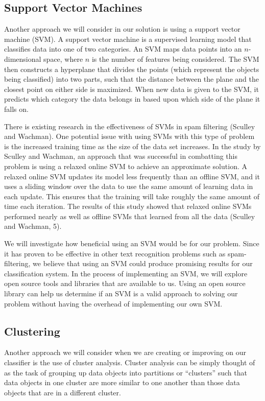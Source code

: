 \documentclass[cs,proposal]{hmcclinic}
\begin{document}
\subsection{Support Vector Machines}

Another approach we will consider in our solution is using a support vector machine (SVM). A support vector machine is a supervised learning model that classifies data into one of two categories. An SVM maps data points into an $n$-dimensional space, where $n$ is the number of features being considered. The SVM then constructs a hyperplane that divides the points (which represent the objects being classified) into two parts, such that the distance between the plane and the closest point on either side is maximized. When new data is given to the SVM, it predicts which category the data belongs in based upon which side of the plane it falls on.

There is existing research in the effectiveness of SVMs in spam filtering (Sculley and Wachman). One potential issue with using SVMs with this type of problem is the increased training time as the size of the data set increases. In the study by Sculley and Wachman, an approach that was successful in combatting this problem is using a relaxed online SVM to achieve an approximate solution. A relaxed online SVM updates its model less frequently than an offline SVM, and it uses a sliding window over the data to use the same amount of learning data in each update. This ensures that the training will take roughly the same amount of time each iteration. The results of this study showed that relaxed online SVMs performed nearly as well as offline SVMs that learned from all the data (Sculley and Wachman, 5).

We will investigate how beneficial using an SVM would be for our problem. Since it has proven to be effective in other text recognition problems such as spam-filtering, we believe that using an SVM could produce promising results for our classification system. In the process of implementing an SVM, we will explore open source tools and libraries that are available to us. Using an open source library can help us determine if an SVM is a valid approach to solving our problem without having the overhead of implementing our own SVM. 

\subsection{Clustering}

Another approach we will consider when we are creating or improving on our classifier is the use of cluster analysis. Cluster analysis can be simply thought of as the task of grouping up data objects into partitions or ``clusters'' such that data objects in one cluster are more similar to one another than those data objects that are in a different cluster.
\end{document}
